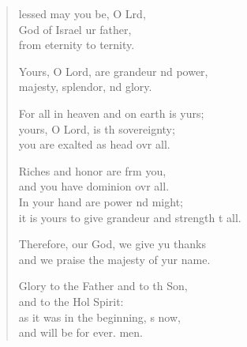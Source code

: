 \settowidth{\versewidth}{it is yours to give grandeur and strength to all.}
\begin{verse}%
  \begin{patverse}
    lessed may you be, O Lrd,\Flex\\
God of Israel ur father,\Med\\
from eternity to ternity.

Yours, O Lord, are grandeur nd power,\Med\\
majesty, splendor, nd glory.

For all in heaven and on earth is yurs;\Flex\\
yours, O Lord, is th sovereignty;\Med\\
you are exalted as head ovr all.

Riches and honor are frm you,\Med\\
and you have dominion ovr all.\\
In your hand are power nd might;\Med\\
it is yours to give grandeur and strength t all.

Therefore, our God, we give yu thanks\Med\\
and we praise the majesty of yur name.

Glory to the Father and to th Son,\Med\\
    and to the Hol Spirit:\\
as it was in the beginning, \pointup{\i}s now,\Med\\
    and will be for ever. men.
  \end{patverse}
\end{verse}
